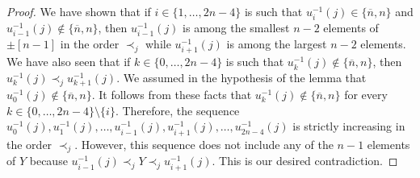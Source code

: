 \documentclass[ALCO,ThmDefs,Unicode,epreuves]{cedram}
\begin{document}
\begin{proof}
We have shown that if $i\in\{1,\ldots,2n-4\}$ is such that $u_{i}^{-1}(j)\in\{\overline n,n\}$ and $u_{i-1}^{-1}(j)\not\in\{\overline n,n\}$, then $u_{i-1}^{-1}(j)$ is among the smallest $n-2$ elements of $\pm[n-1]$ in the order $\prec_j$ while $u_{i+1}^{-1}(j)$ is among the largest $n-2$ elements. We have also seen that if $k\in\{0,\ldots,2n-4\}$ is such that $u_k^{-1}(j)\not\in\{\overline n,n\}$, then $u_k^{-1}(j)\prec_j u_{k+1}^{-1}(j)$. We assumed in the hypothesis of the lemma that $u_0^{-1}(j)\not\in\{\overline n,n\}$. It follows from these facts that $u_k^{-1}(j)\not\in\{\overline n,n\}$ for every $k\in\{0,\ldots,2n-4\}\setminus\{i\}$. Therefore, the sequence $u_0^{-1}(j),u_1^{-1}(j),\ldots,u_{i-1}^{-1}(j),u_{i+1}^{-1}(j),\ldots,u_{2n-4}^{-1}(j)$ is strictly increasing in the order $\prec_j$. However, this sequence does not include any of the $n-1$ elements of $Y$ because $u_{i-1}^{-1}(j)\prec_j Y\prec_j u_{i+1}^{-1}(j)$. This is our desired contradiction. 
\end{proof}
\end{document}
